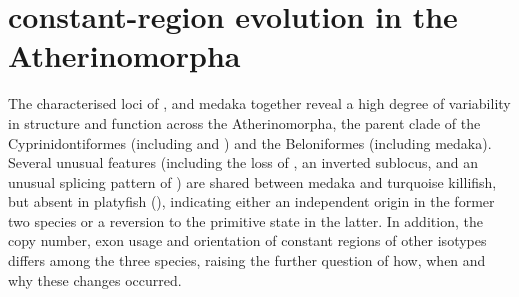 
\section{\igh{} constant-region evolution in the Atherinomorpha}
\label{sec:locus_comparative}




The characterised \igh{} loci of \nfu, \xma and medaka together reveal a high degree of variability in structure and function across the Atherinomorpha, the parent clade of the Cyprinidontiformes (including \Nfu and \Xma) and the Beloniformes (including medaka). Several unusual features (including the loss of , an inverted sublocus, and an unusual splicing pattern of ) are shared between medaka and turquoise killifish, but absent in platyfish (), indicating either an independent origin in the former two species or a reversion to the primitive state in the latter. In addition, the copy number, exon usage and orientation of constant regions of other isotypes differs among the three species, raising the further question of how, when and why these changes occurred. 

